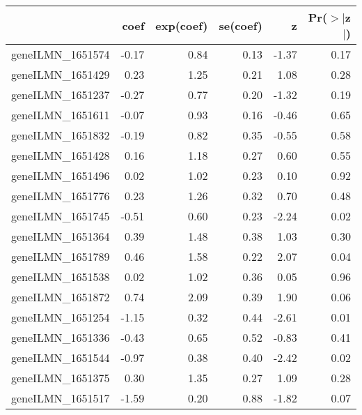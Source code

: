 \begin{table}[ht]
\centering
\begin{tabular}{rrrrrr}
  \hline
 & coef & exp(coef) & se(coef) & z & Pr($>$$|$z$|$) \\ 
  \hline
geneILMN\_1651574 & -0.17 & 0.84 & 0.13 & -1.37 & 0.17 \\ 
  geneILMN\_1651429 & 0.23 & 1.25 & 0.21 & 1.08 & 0.28 \\ 
  geneILMN\_1651237 & -0.27 & 0.77 & 0.20 & -1.32 & 0.19 \\ 
  geneILMN\_1651611 & -0.07 & 0.93 & 0.16 & -0.46 & 0.65 \\ 
  geneILMN\_1651832 & -0.19 & 0.82 & 0.35 & -0.55 & 0.58 \\ 
  geneILMN\_1651428 & 0.16 & 1.18 & 0.27 & 0.60 & 0.55 \\ 
  geneILMN\_1651496 & 0.02 & 1.02 & 0.23 & 0.10 & 0.92 \\ 
  geneILMN\_1651776 & 0.23 & 1.26 & 0.32 & 0.70 & 0.48 \\ 
  geneILMN\_1651745 & -0.51 & 0.60 & 0.23 & -2.24 & 0.02 \\ 
  geneILMN\_1651364 & 0.39 & 1.48 & 0.38 & 1.03 & 0.30 \\ 
  geneILMN\_1651789 & 0.46 & 1.58 & 0.22 & 2.07 & 0.04 \\ 
  geneILMN\_1651538 & 0.02 & 1.02 & 0.36 & 0.05 & 0.96 \\ 
  geneILMN\_1651872 & 0.74 & 2.09 & 0.39 & 1.90 & 0.06 \\ 
  geneILMN\_1651254 & -1.15 & 0.32 & 0.44 & -2.61 & 0.01 \\ 
  geneILMN\_1651336 & -0.43 & 0.65 & 0.52 & -0.83 & 0.41 \\ 
  geneILMN\_1651544 & -0.97 & 0.38 & 0.40 & -2.42 & 0.02 \\ 
  geneILMN\_1651375 & 0.30 & 1.35 & 0.27 & 1.09 & 0.28 \\ 
  geneILMN\_1651517 & -1.59 & 0.20 & 0.88 & -1.82 & 0.07 \\ 
   \hline
\end{tabular}
\end{table}

